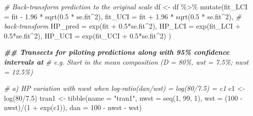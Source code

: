 \documentclass[
  12pt,
]{article}
\newenvironment{Shaded}{\begin{snugshade}}{\end{snugshade}}
\newcommand{\AttributeTok}[1]{\textcolor[rgb]{0.77,0.63,0.00}{#1}}
\newcommand{\CommentTok}[1]{\textcolor[rgb]{0.56,0.35,0.01}{\textit{#1}}}
\newcommand{\DecValTok}[1]{\textcolor[rgb]{0.00,0.00,0.81}{#1}}
\newcommand{\DocumentationTok}[1]{\textcolor[rgb]{0.56,0.35,0.01}{\textbf{\textit{#1}}}}
\newcommand{\FloatTok}[1]{\textcolor[rgb]{0.00,0.00,0.81}{#1}}
\newcommand{\FunctionTok}[1]{\textcolor[rgb]{0.00,0.00,0.00}{#1}}
\newcommand{\NormalTok}[1]{#1}
\newcommand{\OtherTok}[1]{\textcolor[rgb]{0.56,0.35,0.01}{#1}}
\newcommand{\SpecialCharTok}[1]{\textcolor[rgb]{0.00,0.00,0.00}{#1}}
\newcommand{\StringTok}[1]{\textcolor[rgb]{0.31,0.60,0.02}{#1}}
\begin{document}
\begin{Shaded}
\begin{Highlighting}[]
\CommentTok{\# Back{-}transform prediction to the original scale}
\NormalTok{df }\OtherTok{\textless{}{-}}\NormalTok{ df }\SpecialCharTok{\%\textgreater{}\%} 
     \FunctionTok{mutate}\NormalTok{(}\AttributeTok{fit\_LCI =}\NormalTok{ fit }\SpecialCharTok{{-}} \FloatTok{1.96} \SpecialCharTok{*} \FunctionTok{sqrt}\NormalTok{(}\FloatTok{0.5} \SpecialCharTok{*}\NormalTok{ se.fit}\SpecialCharTok{\^{}}\DecValTok{2}\NormalTok{),}
            \AttributeTok{fit\_UCI =}\NormalTok{ fit }\SpecialCharTok{+} \FloatTok{1.96} \SpecialCharTok{*} \FunctionTok{sqrt}\NormalTok{(}\FloatTok{0.5} \SpecialCharTok{*}\NormalTok{ se.fit}\SpecialCharTok{\^{}}\DecValTok{2}\NormalTok{),}
            \CommentTok{\# back{-}transform}
            \AttributeTok{HP\_pred =} \FunctionTok{exp}\NormalTok{(fit }\SpecialCharTok{+} \FloatTok{0.5}\SpecialCharTok{*}\NormalTok{se.fit}\SpecialCharTok{\^{}}\DecValTok{2}\NormalTok{),}
            \AttributeTok{HP\_LCI  =} \FunctionTok{exp}\NormalTok{(fit\_LCI }\SpecialCharTok{+} \FloatTok{0.5}\SpecialCharTok{*}\NormalTok{se.fit}\SpecialCharTok{\^{}}\DecValTok{2}\NormalTok{),}
            \AttributeTok{HP\_UCI  =} \FunctionTok{exp}\NormalTok{(fit\_UCI }\SpecialCharTok{+} \FloatTok{0.5}\SpecialCharTok{*}\NormalTok{se.fit}\SpecialCharTok{\^{}}\DecValTok{2}\NormalTok{)}
\NormalTok{     )}

\DocumentationTok{\#\# Transects for piloting predictions along with 95\% confidence intervals at}
\CommentTok{\# e.g. Start in the mean composition (D = 80\%, wst = 7.5\%; nwst = 12.5\%)}

\CommentTok{\# a) HP variation with nwst when log{-}ratio(dan/wst) = log(80/7.5) = c1 }
\NormalTok{c1 }\OtherTok{\textless{}{-}} \FunctionTok{log}\NormalTok{(}\DecValTok{80}\SpecialCharTok{/}\FloatTok{7.5}\NormalTok{)}
\NormalTok{tran1 }\OtherTok{\textless{}{-}} \FunctionTok{tibble}\NormalTok{(}\AttributeTok{name =} \StringTok{"tran1"}\NormalTok{,}
                \AttributeTok{nwst =} \FunctionTok{seq}\NormalTok{(}\DecValTok{1}\NormalTok{, }\DecValTok{99}\NormalTok{, }\DecValTok{1}\NormalTok{),}
                \AttributeTok{wst =}\NormalTok{ (}\DecValTok{100} \SpecialCharTok{{-}}\NormalTok{ nwst)}\SpecialCharTok{/}\NormalTok{(}\DecValTok{1} \SpecialCharTok{+} \FunctionTok{exp}\NormalTok{(c1)), }
                \AttributeTok{dan =} \DecValTok{100} \SpecialCharTok{{-}}\NormalTok{ nwst }\SpecialCharTok{{-}}\NormalTok{ wst)}


\end{Highlighting}
\end{Shaded}
\end{document}
